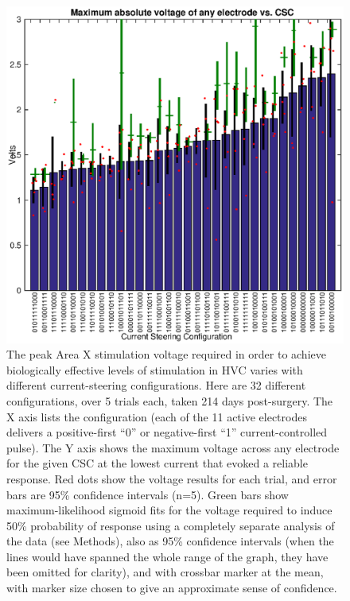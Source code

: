 \documentclass[10pt,letterpaper]{article}
\begin{document}
\begin{figure}
  \includegraphics[width=\textwidth]{VoltageVsCSC}
  \caption{The peak Area X stimulation voltage required in order to achieve biologically effective levels of stimulation in HVC varies with different current-steering configurations.  Here are 32 different configurations, over 5 trials each, taken 214 days post-surgery.  The X axis lists the configuration (each of the 11 active electrodes delivers a positive-first ``0'' or negative-first ``1'' current-controlled pulse).  The Y axis shows the maximum voltage across any electrode for the given CSC at the lowest current that evoked a reliable response.  Red dots show the voltage results for each trial, and error bars are 95\% confidence intervals (n=5).  Green bars show maximum-likelihood sigmoid fits for the voltage required to induce 50\% probability of response using a completely separate analysis of the data (see Methods), also as 95\% confidence intervals (when the lines would have spanned the whole range of the graph, they have been omitted for clarity), and with crossbar marker at the mean, with marker size chosen to give an approximate sense of confidence.}
  \label{fig:VoltageVsCSC}
\end{figure}
\end{document}
